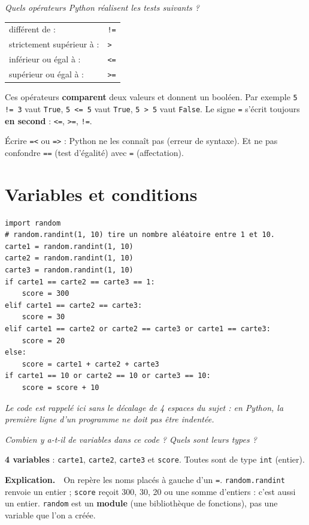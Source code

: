 \documentclass[addpoints, 11pt]{exam}
\newcommand{\enonce}[1]{\textit{#1}\par\smallskip}
\newcommand{\explication}{\par\smallskip\noindent\textbf{Explication.}\ }
\newcommand{\code}[1]{\texttt{#1}}
\DeclareRobustCommand{\_}{\textunderscore\allowbreak}
\begin{document}
\begin{questions}
\question[2] \enonce{Quels opérateurs Python réalisent les tests suivants ?}
\begin{reponse}
\begin{tabular}{ll}
différent de : & \code{!=}\\
strictement supérieur à : & \code{>}\\
inférieur ou égal à : & \code{<=}\\
supérieur ou égal à : & \code{>=}\\
\end{tabular}
\end{reponse}
Ces opérateurs \textbf{comparent} deux valeurs et donnent un booléen. Par exemple \code{5 != 3} vaut \code{True}, \code{5 <= 5} vaut \code{True}, \code{5 > 5} vaut \code{False}. Le signe \code{=} s'écrit toujours \textbf{en second} : \code{<=}, \code{>=}, \code{!=}.

\begin{erreur}
Écrire \code{=<} ou \code{=>} : Python ne les connaît pas (erreur de syntaxe). Et ne pas confondre \code{==} (test d'égalité) avec \code{=} (affectation).
\end{erreur}

\section{Variables et conditions}

\begin{lstlisting}
import random
# random.randint(1, 10) tire un nombre aléatoire entre 1 et 10.
carte1 = random.randint(1, 10)
carte2 = random.randint(1, 10)
carte3 = random.randint(1, 10)
if carte1 == carte2 == carte3 == 1:
    score = 300
elif carte1 == carte2 == carte3:
    score = 30
elif carte1 == carte2 or carte2 == carte3 or carte1 == carte3:
    score = 20
else:
    score = carte1 + carte2 + carte3
if carte1 == 10 or carte2 == 10 or carte3 == 10:
    score = score + 10
\end{lstlisting}
\textit{Le code est rappelé ici sans le décalage de 4 espaces du sujet : en Python, la première ligne d'un programme ne doit pas être indentée.}

\question[1] \enonce{Combien y a-t-il de variables dans ce code ? Quels sont leurs types ?}
\begin{reponse}
\textbf{4 variables} : \code{carte1}, \code{carte2}, \code{carte3} et \code{score}. Toutes sont de type \code{int} (entier).
\end{reponse}
\explication\ On repère les noms placés à gauche d'un \code{=}. \code{random.randint} renvoie un entier ; \code{score} reçoit 300, 30, 20 ou une somme d'entiers : c'est aussi un entier. \code{random} est un \textbf{module} (une bibliothèque de fonctions), pas une variable que l'on a créée.


\end{questions}
\end{document}
